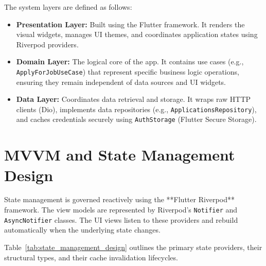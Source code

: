 The system layers are defined as follows:
\begin{itemize}
    \item \textbf{Presentation Layer:} Built using the Flutter framework. It renders the visual widgets, manages UI themes, and coordinates application states using Riverpod providers.
    \item \textbf{Domain Layer:} The logical core of the app. It contains use cases (e.g., \texttt{ApplyForJobUseCase}) that represent specific business logic operations, ensuring they remain independent of data sources and UI widgets.
    \item \textbf{Data Layer:} Coordinates data retrieval and storage. It wraps raw HTTP clients (Dio), implements data repositories (e.g., \texttt{ApplicationsRepository}), and caches credentials securely using \texttt{AuthStorage} (Flutter Secure Storage).
\end{itemize}

\section{MVVM and State Management Design}
State management is governed reactively using the **Flutter Riverpod** framework. The view models are represented by Riverpod's \texttt{Notifier} and \texttt{AsyncNotifier} classes. The UI views listen to these providers and rebuild automatically when the underlying state changes.

Table~\ref{tab:state_management_design} outlines the primary state providers, their structural types, and their cache invalidation lifecycles.

